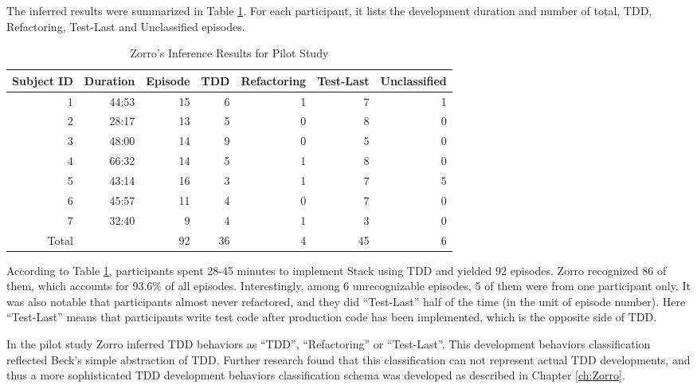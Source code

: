 The inferred results were summarized in Table \ref{tab:ZorroPilotStudy}. For each participant, it lists the development duration and number of total, TDD, Refactoring, Test-Last and Unclassified episodes.
\begin{table}[htbp]
\centering
  \caption{Zorro's Inference Results for Pilot Study}
  \begin{tabular}{|r|r|r|r|r|r|r|}
  \hline
    Subject ID & Duration & Episode & TDD & Refactoring & Test-Last & Unclassified \\ \hline
    1 & 44:53 & 15 &  6 &  1 &  7 & 1 \\ \hline
    2 & 28:17 & 13 &  5 &  0 &  8 & 0 \\ \hline
    3 & 48:00 & 14 &  9 &  0 &  5 & 0 \\ \hline
    4 & 66:32 & 14 &  5 &  1 &  8 & 0 \\ \hline
    5 & 43:14 & 16 &  3 &  1 &  7 & 5 \\ \hline
    6 & 45:57 & 11 &  4 &  0 &  7 & 0 \\ \hline
    7 & 32:40 &  9 &  4 &  1 &  3 & 0 \\ \hline \hline
    Total &   & 92 & 36 &  4 & 45 & 6 \\ 
  \hline
  \end{tabular}
  \label{tab:ZorroPilotStudy}  
\end{table}
According to Table \ref{tab:ZorroPilotStudy}, participants spent 28-45 minutes to implement Stack using TDD and yielded 92 episodes. Zorro recognized 86 of them, which accounts for 93.6\% of all episodes. Interestingly, among 6 unrecognizable episodes, 5 of them were from one participant only. It was also notable that participants almost never refactored, and they did ``Test-Last'' half of the time (in the unit of episode number). Here ``Test-Last'' means that participants write test code after production code has been implemented, which is the opposite side of TDD.

In the pilot study Zorro inferred TDD behaviors as ``TDD'', ``Refactoring'' or ``Test-Last''. This development behaviors classification reflected Beck's \cite{Beck:03} simple abstraction of TDD. Further research found that this classification can not represent actual TDD developments, and thus a more sophisticated TDD development behaviors classification schema was developed as described in Chapter \ref{ch:Zorro}.

